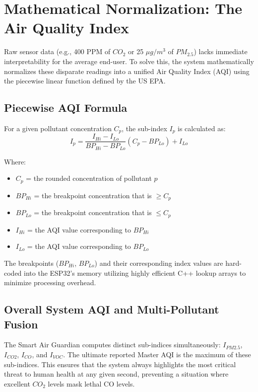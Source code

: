 \documentclass[12pt,journal,onecolumn,a4paper]{IEEEtran}
\begin{document}
\section{Mathematical Normalization: The Air Quality Index}
Raw sensor data (e.g., 400 PPM of $CO_2$ or 25 $\mu g/m^3$ of $PM_{2.5}$) lacks immediate interpretability for the average end-user. To solve this, the system mathematically normalizes these disparate readings into a unified Air Quality Index (AQI) using the piecewise linear function defined by the US EPA.

\subsection{Piecewise AQI Formula}
For a given pollutant concentration $C_p$, the sub-index $I_p$ is calculated as:
\begin{equation}
I_p = \frac{I_{Hi} - I_{Lo}}{BP_{Hi} - BP_{Lo}} (C_p - BP_{Lo}) + I_{Lo}
\end{equation}

Where:
\begin{itemize}
    \item $C_p$ = the rounded concentration of pollutant $p$
    \item $BP_{Hi}$ = the breakpoint concentration that is $\geq C_p$
    \item $BP_{Lo}$ = the breakpoint concentration that is $\leq C_p$
    \item $I_{Hi}$ = the AQI value corresponding to $BP_{Hi}$
    \item $I_{Lo}$ = the AQI value corresponding to $BP_{Lo}$
\end{itemize}

The breakpoints ($BP_{Hi}$, $BP_{Lo}$) and their corresponding index values are hard-coded into the ESP32's memory utilizing highly efficient C++ lookup arrays to minimize processing overhead.

\subsection{Overall System AQI and Multi-Pollutant Fusion}
The Smart Air Guardian computes distinct sub-indices simultaneously: $I_{PM2.5}$, $I_{CO2}$, $I_{CO}$, and $I_{VOC}$. The ultimate reported Master AQI is the maximum of these sub-indices. This ensures that the system always highlights the most critical threat to human health at any given second, preventing a situation where excellent $CO_2$ levels mask lethal CO levels.
\end{document}
